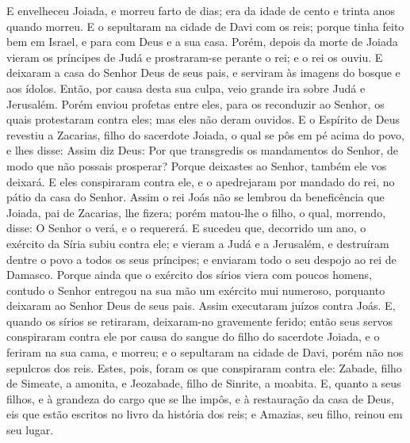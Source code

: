 E envelheceu Joiada, e morreu farto de dias; era da idade de
cento e trinta anos quando morreu. E o sepultaram na cidade
de Davi com os reis; porque tinha feito bem em Israel, e para com
Deus e a sua casa. Porém, depois da morte de Joiada vieram os
príncipes de Judá e prostraram-se perante o rei; e o rei os ouviu.
E deixaram a casa do Senhor Deus de seus pais, e serviram às
imagens do bosque e aos ídolos. Então, por causa desta sua culpa,
veio grande ira sobre Judá e Jerusalém. Porém enviou profetas
entre eles, para os reconduzir ao Senhor, os quais protestaram
contra eles; mas eles não deram ouvidos. E o Espírito de Deus
revestiu a Zacarias, filho do sacerdote Joiada, o qual se pôs em pé
acima do povo, e lhes disse: Assim diz Deus: Por que transgredis os
mandamentos do Senhor, de modo que não possais prosperar? Porque
deixastes ao Senhor, também ele vos deixará. E eles
conspiraram contra ele, e o apedrejaram por mandado do rei, no pátio
da casa do Senhor. Assim o rei Joás não se lembrou da
beneficência que Joiada, pai de Zacarias, lhe fizera; porém
matou-lhe o filho, o qual, morrendo, disse: O Senhor o verá, e o
requererá. E sucedeu que, decorrido um ano, o exército da
Síria subiu contra ele; e vieram a Judá e a Jerusalém, e destruíram
dentre o povo a todos os seus príncipes; e enviaram todo o seu
despojo ao rei de Damasco. Porque ainda que o exército dos
sírios viera com poucos homens, contudo o Senhor entregou na sua mão
um exército mui numeroso, porquanto deixaram ao Senhor Deus de seus
pais. Assim executaram juízos contra Joás. E, quando os
sírios se retiraram, deixaram-no gravemente ferido; então seus
servos conspiraram contra ele por causa do sangue do filho do
sacerdote Joiada, e o feriram na sua cama, e morreu; e o sepultaram
na cidade de Davi, porém não nos sepulcros dos reis. Estes,
pois, foram os que conspiraram contra ele: Zabade, filho de Simeate,
a amonita, e Jeozabade, filho de Sinrite, a moabita. E,
quanto a seus filhos, e à grandeza do cargo que se lhe impôs, e à
restauração da casa de Deus, eis que estão escritos no livro da
história dos reis; e Amazias, seu filho, reinou em seu lugar.

\medskip

